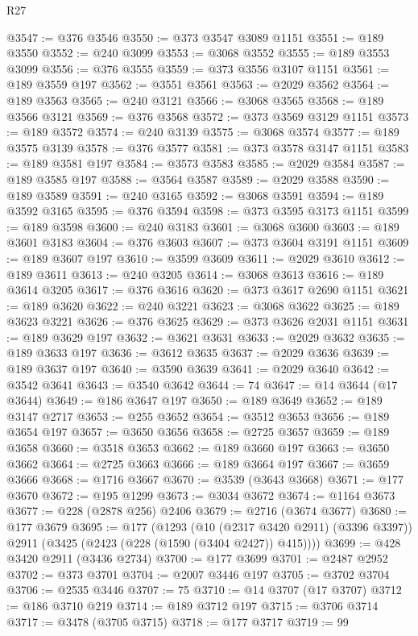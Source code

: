\begin{lexlean}{R27}
\begin{coremodule}
@3547 := @376 @3546
@3550 := @373 @3547 @3089 @1151
@3551 := @189 @3550
@3552 := @240 @3099
@3553 := @3068 @3552
@3555 := @189 @3553 @3099
@3556 := @376 @3555
@3559 := @373 @3556 @3107 @1151
@3561 := @189 @3559 @197
@3562 := @3551 @3561
@3563 := @2029 @3562
@3564 := @189 @3563
@3565 := @240 @3121
@3566 := @3068 @3565
@3568 := @189 @3566 @3121
@3569 := @376 @3568
@3572 := @373 @3569 @3129 @1151
@3573 := @189 @3572
@3574 := @240 @3139
@3575 := @3068 @3574
@3577 := @189 @3575 @3139
@3578 := @376 @3577
@3581 := @373 @3578 @3147 @1151
@3583 := @189 @3581 @197
@3584 := @3573 @3583
@3585 := @2029 @3584
@3587 := @189 @3585 @197
@3588 := @3564 @3587
@3589 := @2029 @3588
@3590 := @189 @3589
@3591 := @240 @3165
@3592 := @3068 @3591
@3594 := @189 @3592 @3165
@3595 := @376 @3594
@3598 := @373 @3595 @3173 @1151
@3599 := @189 @3598
@3600 := @240 @3183
@3601 := @3068 @3600
@3603 := @189 @3601 @3183
@3604 := @376 @3603
@3607 := @373 @3604 @3191 @1151
@3609 := @189 @3607 @197
@3610 := @3599 @3609
@3611 := @2029 @3610
@3612 := @189 @3611
@3613 := @240 @3205
@3614 := @3068 @3613
@3616 := @189 @3614 @3205
@3617 := @376 @3616
@3620 := @373 @3617 @2690 @1151
@3621 := @189 @3620
@3622 := @240 @3221
@3623 := @3068 @3622
@3625 := @189 @3623 @3221
@3626 := @376 @3625
@3629 := @373 @3626 @2031 @1151
@3631 := @189 @3629 @197
@3632 := @3621 @3631
@3633 := @2029 @3632
@3635 := @189 @3633 @197
@3636 := @3612 @3635
@3637 := @2029 @3636
@3639 := @189 @3637 @197
@3640 := @3590 @3639
@3641 := @2029 @3640
@3642 := @3542 @3641
@3643 := @3540 @3642
@3644 := 74
@3647 := @14 @3644 (@17 @3644)
@3649 := @186 @3647 @197
@3650 := @189 @3649
@3652 := @189 @3147 @2717
@3653 := @255 @3652
@3654 := @3512 @3653
@3656 := @189 @3654 @197
@3657 := @3650 @3656
@3658 := @2725 @3657
@3659 := @189 @3658
@3660 := @3518 @3653
@3662 := @189 @3660 @197
@3663 := @3650 @3662
@3664 := @2725 @3663
@3666 := @189 @3664 @197
@3667 := @3659 @3666
@3668 := @1716 @3667
@3670 := @3539 (@3643 @3668)
@3671 := @177 @3670
@3672 := @195 @1299
@3673 := @3034 @3672
@3674 := @1164 @3673
@3677 := @228 (@2878 @256) @2406
@3679 := @2716 (@3674 @3677)
@3680 := @177 @3679
@3695 := @177
    (@1293
      (@10 (@2317 @3420 @2911) (@3396 @3397))
      @2911
      (@3425 (@2423 (@228 (@1590 (@3404 @2427)) @415))))
@3699 := @428 @3420 @2911 (@3436 @2734)
@3700 := @177 @3699
@3701 := @2487 @2952
@3702 := @373 @3701
@3704 := @2007 @3446 @197
@3705 := @3702 @3704
@3706 := @2535 @3446
@3707 := 75
@3710 := @14 @3707 (@17 @3707)
@3712 := @186 @3710 @219
@3714 := @189 @3712 @197
@3715 := @3706 @3714
@3717 := @3478 (@3705 @3715)
@3718 := @177 @3717
@3719 := 99

\end{coremodule}
\end{lexlean}
